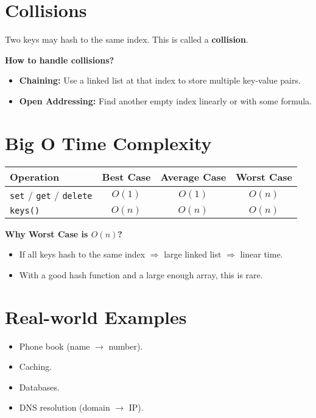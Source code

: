 \documentclass{thesisnotes}
\begin{document}
\section*{Collisions}
Two keys may hash to the same index. This is called a \textbf{collision}.

\textbf{How to handle collisions?}
\begin{itemize}
    \item \textbf{Chaining:} Use a linked list at that index to store multiple key-value pairs.
    \item \textbf{Open Addressing:} Find another empty index linearly or with some formula.
\end{itemize}

\section*{Big O Time Complexity}
\begin{center}
    \begin{tabular}{|l|c|c|c|}
        \hline
        \textbf{Operation} & \textbf{Best Case} & \textbf{Average Case} & \textbf{Worst Case} \\
        \hline
        \texttt{set} / \texttt{get} / \texttt{delete} & $O(1)$ & $O(1)$ & $O(n)$ \\
        \hline
        \texttt{keys()} & $O(n)$ & $O(n)$ & $O(n)$ \\
        \hline
    \end{tabular}
\end{center}

\textbf{Why Worst Case is $O(n)$?}
\begin{itemize}
    \item If all keys hash to the same index $\Rightarrow$ large linked list $\Rightarrow$ linear time.
    \item With a good hash function and a large enough array, this is rare.
\end{itemize}

\section*{Real-world Examples}
\begin{itemize}
    \item Phone book (name $\rightarrow$ number).
    \item Caching.
    \item Databases.
    \item DNS resolution (domain $\rightarrow$ IP).
\end{itemize}
\end{document}
